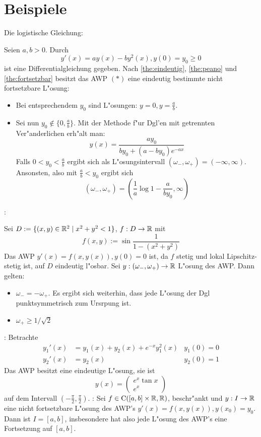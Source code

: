 \section{Beispiele}
\remark Die logistische Gleichung:{
  Seien $a,b>0$. Durch
  \begin{equation*}
    y'(x)=ay(x)-by^2(x),y(0)=y_0\geq 0     \tag{*}
    \end{equation*}
  ist eine Differentialgleichung gegeben. Nach \ref{the:eindeutig},
  \ref{the:peano} und \ref{the:fortsetzbar} besitzt das AWP $(*)$ eine 
  eindeutig bestimmte nicht fortsetzbare L"osung:
  \begin{itemize}
    \item Bei entsprechendem $y_0$ sind L"osungen: $y=0,y=\frac a b$.
    \item Sei nun $y_0\not\in\{0,\frac a b\}$. Mit der Methode f"ur Dgl'en
      mit getrennten Ver"anderlichen erh"alt man:
      \[y(x)=\frac{ay_0}{by_0+(a-by_0)e^{-ax}}
        \]
      Falls $0<y_0<\frac a b$ ergibt sich als L"osungsintervall
      $(\omega_-,\omega_+)=(-\infty,\infty)$. Ansonsten, also mit 
      $\frac a b<y_0$ ergibt sich
      \[(\omega_-,\omega_+)=(\frac 1 a \log 1-\frac a {by_0},\infty)
        \]
    \end{itemize}
  }
\remark:{
  Sei $D:=\{(x,y)\in\mathbb R^2\mid x^2+y^2<1\}$, $f:D\to\mathbb R$ mit
  \[f(x,y):=\sin\frac 1 {1-(x^2+y^2)}
    \]
  Das AWP $y'(x)=f(x,y(x)),y(0)=0$ ist, da 
  $f$ stetig und lokal Lipschitz-stetig ist, auf $D$ eindeutig l"osbar.
  Sei $y:(\omega_-,\omega_+)\to\mathbb R$ L"osung des AWP. Dann gelten:
  \begin{itemize}
    \item $\omega_-=-\omega_+$. Es ergibt sich weiterhin, dass jede
      L"osung der Dgl punktsymmetrisch zum Ursrpung ist.
    \item $\omega_+\geq 1/\sqrt{2}$
    \end{itemize}
  }
\remark:{
  Betrachte
  \begin{align*}
    y_1'(x)&=y_1(x)+y_2(x)+e^{-x}y_1^2(x)&y_1(0)=0 \\
    y_2'(x)&=y_2(x)&y_2(0)=1
    \end{align*}
  Das AWP besitzt eine eindeutige L"osung, sie ist
  \[y(x)=\begin{pmatrix} e^x\tan x \\ e^x \end{pmatrix}
    \]
  auf dem Intervall $(-\frac \pi 2,\frac \pi 2)$.
  }
\remark:{
  Sei $f\in{\rm C}([a,b]\times\mathbb R,\mathbb R)$, beschr"ankt und 
  $y:I\to\mathbb R$ eine nicht fortsetzbare L"osung des AWP's 
  $y'(x)=f(x,y(x)),y(x_0)=y_0$. Dann ist $I=[a,b]$, insbesondere
  hat also jede L"osung des AWP's eine Fortsetzung auf $[a,b]$.
  }
